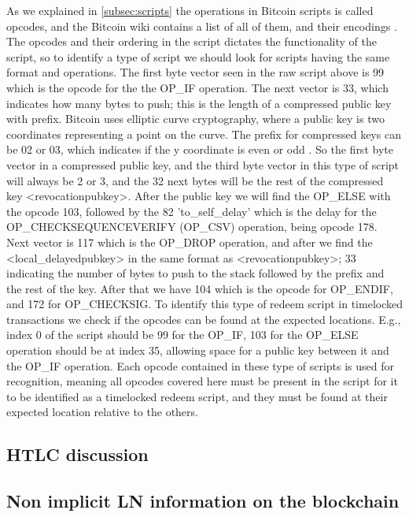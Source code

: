 As we explained in \cref{subsec:scripts} the operations in Bitcoin scripts is called opcodes, and the Bitcoin wiki contains a list of all of them, and their encodings \cite{bitcoin_wiki_scripts}. The opcodes and their ordering in the script dictates the functionality of the script, so to identify a type of script we should look for scripts having the same format and operations.
The first byte vector seen in the raw script above is 99 which is the opcode for the the OP\_IF operation. The next vector is 33, which indicates how many bytes to push; this is the length of a compressed public key with prefix. Bitcoin uses elliptic curve cryptography, where a public key is two coordinates representing a point on the curve. The prefix for compressed keys can be 02 or 03, which indicates if the y coordinate is even or odd \cite{antonopoulos2017mastering}. So the first byte vector in a compressed public key, and the third byte vector in this type of script will always be 2 or 3, and the 32 next bytes will be the rest of the compressed key <revocationpubkey>. After the public key we will find the OP\_ELSE with the opcode 103, followed by the 82 'to\_self\_delay' which is the delay for the OP\_CHECKSEQUENCEVERIFY (OP\_CSV) operation, being opcode 178. 
Next vector is 117 which is the OP\_DROP operation, and after we find the <local\_delayedpubkey> in the same format as <revocationpubkey>; 33 indicating the number of bytes to push to the stack followed by the prefix and the rest of the key. After that we have 104 which is the opcode for OP\_ENDIF, and 172 for OP\_CHECKSIG.
To identify this type of redeem script in timelocked transactions we check if the opcodes can be found at the expected locations. E.g., index 0 of the script should be 99 for the OP\_IF, 103 for the OP\_ELSE operation should be at index 35, allowing space for a public key between it and the OP\_IF operation. Each opcode contained in these type of scripts is used for recognition, meaning all opcodes covered here must be present in the script for it to be identified as a timelocked redeem script, and they must be found at their expected location relative to the others.
\\

\subsection{HTLC discussion}
\label{subsec:information_ln}

\subsection{Non implicit LN information on the blockchain}
\label{subsec:information_ln}

